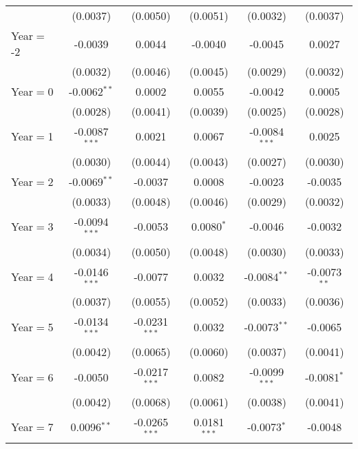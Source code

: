 \begin{table}[htbp]
\begin{tabular}{lccccc}
                           & (0.0037)        & (0.0050)        & (0.0051)       & (0.0032)        & (0.0037)\\
      Year$=$-2            & -0.0039         & 0.0044          & -0.0040        & -0.0045         & 0.0027\\
                           & (0.0032)        & (0.0046)        & (0.0045)       & (0.0029)        & (0.0032)\\
      Year$=$0             & -0.0062$^{**}$  & 0.0002          & 0.0055         & -0.0042         & 0.0005\\
                           & (0.0028)        & (0.0041)        & (0.0039)       & (0.0025)        & (0.0028)\\
      Year$=$1             & -0.0087$^{***}$ & 0.0021          & 0.0067         & -0.0084$^{***}$ & 0.0025\\
                           & (0.0030)        & (0.0044)        & (0.0043)       & (0.0027)        & (0.0030)\\
      Year$=$2             & -0.0069$^{**}$  & -0.0037         & 0.0008         & -0.0023         & -0.0035\\
                           & (0.0033)        & (0.0048)        & (0.0046)       & (0.0029)        & (0.0032)\\
      Year$=$3             & -0.0094$^{***}$ & -0.0053         & 0.0080$^{*}$   & -0.0046         & -0.0032\\
                           & (0.0034)        & (0.0050)        & (0.0048)       & (0.0030)        & (0.0033)\\
      Year$=$4             & -0.0146$^{***}$ & -0.0077         & 0.0032         & -0.0084$^{**}$  & -0.0073$^{**}$\\
                           & (0.0037)        & (0.0055)        & (0.0052)       & (0.0033)        & (0.0036)\\
      Year$=$5             & -0.0134$^{***}$ & -0.0231$^{***}$ & 0.0032         & -0.0073$^{**}$  & -0.0065\\
                           & (0.0042)        & (0.0065)        & (0.0060)       & (0.0037)        & (0.0041)\\
      Year$=$6             & -0.0050         & -0.0217$^{***}$ & 0.0082         & -0.0099$^{***}$ & -0.0081$^{*}$\\
                           & (0.0042)        & (0.0068)        & (0.0061)       & (0.0038)        & (0.0041)\\
      Year$=$7             & 0.0096$^{**}$   & -0.0265$^{***}$ & 0.0181$^{***}$ & -0.0073$^{*}$   & -0.0048\\

\end{tabular}
\end{table}
